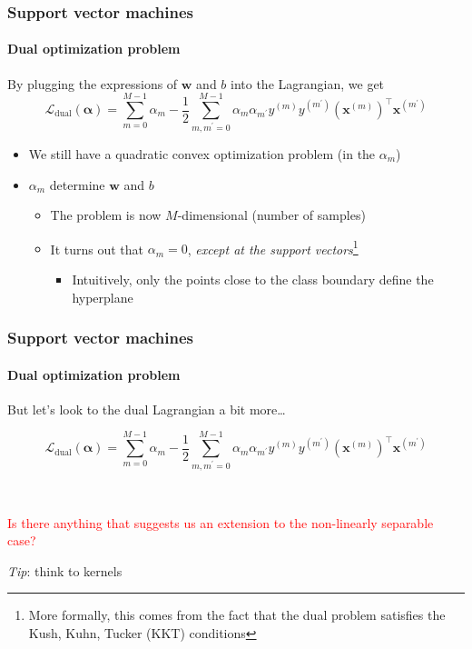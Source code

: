\documentclass[aspectratio=43]{beamer}
\begin{document}
\begin{frame}
  \frametitle{Support vector machines}
  \framesubtitle{Dual optimization problem}

  By plugging the expressions of $\mathbf{w}$ and $b$ into the Lagrangian, we get
  \[\mathcal{L}_{\mathrm{dual}}\left( \mathbf{\alpha} \right) = \sum_{m=0}^{M-1}\alpha_m - \frac{1}{2}\sum_{m,m^\prime=0}^{M-1}\alpha_m\alpha_{m^\prime}y^{(m)}y^{(m^\prime)}\left( \mathbf{x}^{(m)} \right)^\top \mathbf{x}^{(m^\prime)}\]

  \begin{itemize}
    \item<2-> We still have a quadratic convex optimization problem (in the $\alpha_m$)
    \item<3-> $\alpha_m$ determine $\mathbf{w}$ and $b$
    \begin{itemize}
      \item<4-> The problem is now $M$-dimensional (number of samples)
      \item<5-> It turns out that $\alpha_m=0$, \emph{except at the support vectors}\footnote{More formally, this comes from the fact that the dual problem satisfies the Kush, Kuhn, Tucker (KKT) conditions}
      \begin{itemize}
        \item Intuitively, only the points close to the class boundary define the hyperplane
      \end{itemize}
    \end{itemize}
  \end{itemize}

\end{frame}


\begin{frame}
  \frametitle{Support vector machines}
  \framesubtitle{Dual optimization problem}
  
  But let's look to the dual Lagrangian a bit more\dots

  \[\mathcal{L}_{\mathrm{dual}}\left( \mathbf{\alpha} \right) = \sum_{m=0}^{M-1}\alpha_m - \frac{1}{2}\sum_{m,m^\prime=0}^{M-1}\alpha_m\alpha_{m^\prime}y^{(m)}y^{(m^\prime)}\left( \mathbf{x}^{(m)} \right)^\top \mathbf{x}^{(m^\prime)}\]

  \ \\
  \pause
  \begin{center}
    \textcolor{red}{Is there anything that suggests us an extension to the non-linearly separable case?}

    \pause
    \emph{Tip}: think to kernels
  \end{center}

  
\end{frame}
\end{document}
